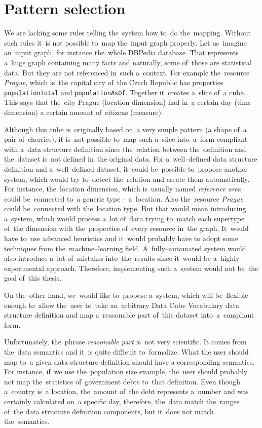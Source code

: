 \section{Pattern selection}
We are lacking some rules telling the~system how to~do the~mapping. 
Without such rules it~is not possible to~map the~input graph properly. Let us~imagine an~input graph, for instance the~whole DBPedia database. That represents a~huge graph 
containing many facts and naturally, some of~those are statistical data. But they 
are not referenced in~such a~context. For example the~resource \emph{Prague}, which is~the 
capital city of~the Czech Republic has properties \texttt{populationTotal} and
\texttt{populationAsOf}. Together it~creates a~slice of~a cube. This says that the~city Prague (location dimension) had in~a certain day (time dimension) 
a certain amount of~citizens (measure).

Although this cube is~originally based on~a very simple pattern (a shape of~a pair of~cherries),
it is~not possible to~map such a~slice into~a~form compliant with a~data structure definition since the~relation between the~definition and the~dataset is~not defined in~the original data. For a~well--defined data structure 
definition and a~well--defined dataset, it~could be~possible to~propose another 
system, which would try to~detect the~relation and create them 
automatically. For instance, the~location dimension, which is~usually named
\emph{reference area} could be~connected to~a generic type -- a~location.
Also the~resource \emph{Prague} could be~connected with the~location type. But 
that would mean introducing a~system, which would process a~lot of~data trying to~match each supertype of~the dimension with the~properties of~every resource in~the graph. It~would have to~use advanced heuristics and it~would probably have 
to adopt some techniques from the~machine--learning field. A~fully--automated 
system would also introduce a~lot of~mistakes into~the~results since it~would 
be a~highly experimental approach. Therefore, implementing such a~system would 
not be~the goal of~this thesis. 

On the~other hand, we~would like to~propose a~system, which will be~flexible 
enough to~allow the~user to~take an~arbitrary Data Cube Vocabulary data 
structure definition and map a~reasonable part of~this dataset into~a~compliant 
form.

Unfortunately, the~phrase \emph{reasonable part} is~not very scientific. 
It comes from the~data semantics and it~is quite difficult to~formalize. What 
the user should map to~a given data structure definition should have 
a corresponding semantics. For instance, if~we use the~population size example, the~user should probably not map the~statistics of~government debts to~that 
definition. Even though a~country is~a location, the~amount of~the debt represents a~number and was certainly calculated on~a specific day, therefore, the~data match the~ranges of~the data structure definition components, but it~does 
not match the~semantics.

